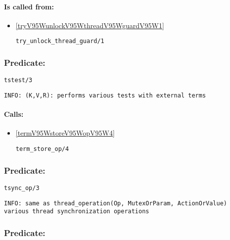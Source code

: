 \paragraph{Is called from:} 
\begin{itemize}
\item \ref{tryV95WunlockV95WthreadV95WguardV95W1} 
\begin{verbatim}
try_unlock_thread_guard/1
\end{verbatim}

\end{itemize}

\subsubsection{Predicate:} \label{tstestV95W3}

\begin{verbatim}
tstest/3
\end{verbatim}

{\small \begin{verbatim}
INFO: (K,V,R): performs various tests with external terms

\end{verbatim}}
\paragraph{Calls:} 
\begin{itemize}
\item \ref{termV95WstoreV95WopV95W4} 
\begin{verbatim}
term_store_op/4
\end{verbatim}

\end{itemize}

\subsubsection{Predicate:} \label{tsyncV95WopV95W3}

\begin{verbatim}
tsync_op/3
\end{verbatim}

{\small \begin{verbatim}
INFO: same as thread_operation(Op, MutexOrParam, ActionOrValue) various thread synchronization operations

\end{verbatim}}

\subsubsection{Predicate:} \label{ttyprinV95W1}

